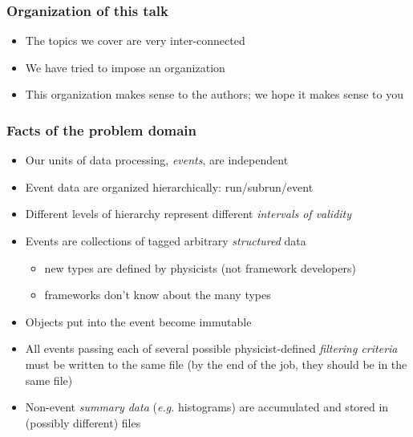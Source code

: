 \documentclass{beamer}
\begin{document}

\begin{frame}
  \frametitle{Organization of this talk}
  \begin{itemize}
    \item The topics we cover are very inter-connected
    \item We have tried to impose an organization
    \item This organization makes sense to the authors; we hope it makes
          sense to you
  \end{itemize}
\end{frame}

\begin{frame}
  \frametitle{Facts of the problem domain}
  \begin{itemize}
    \item Our units of data processing, \emph{events}, are
          independent
    \item Event data are organized hierarchically: run/subrun/event
    \item Different levels of hierarchy represent different \emph{intervals
          of validity}
    \item Events are collections of tagged arbitrary \emph{structured} data
    \begin{itemize}
      \item new types are defined by physicists (not framework developers)
      \item frameworks don't know about the many types
    \end{itemize}
    \item Objects put into the event become immutable
    \item All events passing each of several possible physicist-defined
          \emph{filtering criteria} must be written to the same file
          (by the end of the job, they should be in the same file)
     \item Non-event \emph{summary data} (\textit{e.g.} histograms) are
           accumulated and stored in (possibly different) files
  \end{itemize}
\end{frame}
\end{document}
